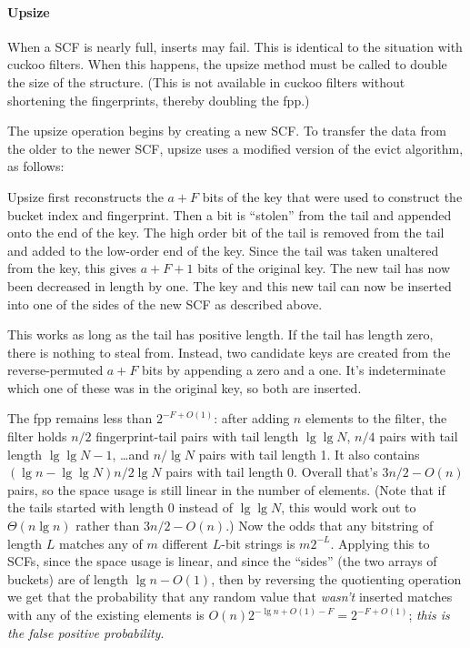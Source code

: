 \documentclass[letterpaper,twocolumn,10pt]{article}
\newcommand{\TCF}{SCF}
\newcommand{\TCF}{TCF}
\begin{document}

\paragraph{Upsize}
When a \TCF{} is nearly full, inserts may fail.
This is identical to the situation with cuckoo filters.
When this happens, the upsize method must be called to double the size of the structure. %
(This is not available in cuckoo filters without shortening the fingerprints, thereby doubling the fpp.)

The upsize operation begins by creating a new \TCF{}. %
To transfer the data from the older to the newer \TCF{}, upsize uses a modified version of the evict algorithm, as follows:

Upsize first reconstructs the $a+F$ bits of the key that were used to construct the bucket index and fingerprint. %
Then a bit is ``stolen'' from the tail and appended onto the end of the key. %
The high order bit of the tail is removed from the tail and added to the low-order end of the key.
Since the tail was taken unaltered from the key, this gives $a+F+1$ bits of the original key.
The new tail has now been decreased in length by one.
The key and this new tail can now be inserted into one of the sides of the new \TCF{} as described above. %

This works as long as the tail has positive length.
If the tail has length zero, there is nothing to steal from.
Instead, two candidate keys are created from the reverse-permuted $a+F$ bits by appending a zero and a one. %
It's indeterminate which one of these was in the original key, so both are inserted. %

The fpp remains less than $2^{-F+O(1)}$:
after adding $n$ elements to the filter, the filter holds $n/2$ fingerprint-tail pairs with tail length $\lg \lg N$, $n/4$ pairs with tail length $\lg \lg N - 1$, \dots and $n/\lg N$ pairs with tail length 1.
It also contains $(\lg n - \lg \lg N)  n / 2 \lg N$ pairs with tail length 0.
Overall that's $3n/2 - O(n)$ pairs, so the space usage is still linear in the number of elements.
(Note that if the tails started with length 0 instead of $\lg \lg N$, this would work out to $\Theta(n \lg n)$ rather than $3n/2 - O(n)$.)
Now the odds that any bitstring of length $L$ matches any of $m$ different $L$-bit strings is $m 2^{-L}$.
Applying this to \TCF{}s, since the space usage is linear, and since the ``sides'' (the two arrays of buckets) are of length $\lg n - O(1)$, then by reversing the quotienting operation we get that the probability that any random value that {\em wasn't} inserted matches with any of the existing elements is $O(n) 2^{-\lg n + O(1) - F} = 2^{-F+O(1)}$; {\em this is the false positive probability}.
\end{document}
